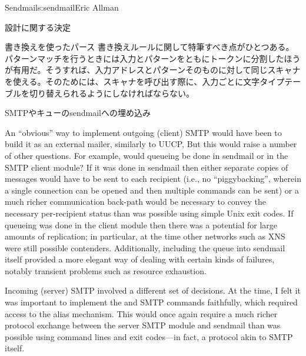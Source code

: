 \begin{aosachapter}{Sendmail}{s:sendmail}{Eric Allman}
\begin{aosasect1}{設計に関する決定}
\begin{aosasect2}{書き換えを使ったパース}
書き換えルールに関して特筆すべき点がひとつある。パターンマッチを行うときには入力とパターンをともにトークンに分割したほうが有用だ。そうすれば、入力アドレスとパターンそのものに対して同じスキャナを使える。そのためには、スキャナを呼び出す際に、入力ごとに文字タイプテーブルを切り替えられるようにしなければならない。

\end{aosasect2}

\begin{aosasect2}{SMTPやキューのsendmailへの埋め込み}

An ``obvious'' way to implement outgoing (client) SMTP would have been
to build it as an external mailer, similarly to UUCP,  But this would
raise a number of other questions. For example, would queueing be done
in sendmail or in the SMTP client module? If it was done in sendmail
then either separate copies of messages would have to be sent to each
recipient (i.e., no ``piggybacking'', wherein a single connection can
be opened and then multiple  commands can be sent) or a much
richer communication back-path would be necessary to convey the
necessary per-recipient status than was possible using simple Unix
exit codes. If queueing was done in the client module then there was a
potential for large amounts of replication; in particular, at the time
other networks such as XNS were still possible
contenders. Additionally, including the queue into sendmail itself
provided a more elegant way of dealing with certain kinds of failures,
notably transient problems such as resource exhaustion.

Incoming (server) SMTP involved a different set of decisions. At the
time, I felt it was important to implement the  and
 SMTP commands faithfully, which required access to the
alias mechanism.  This would once again require a much richer protocol
exchange between the server SMTP module and sendmail than was possible
using command lines and exit codes---in fact, a protocol akin to SMTP
itself.


\end{aosasect2}
\end{aosasect1}
\end{aosachapter}
